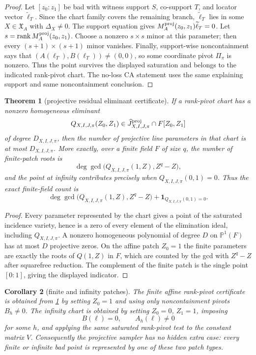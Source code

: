 \documentclass[11pt]{article}
\newtheorem{theorem}{Theorem}[section]
\newtheorem{corollary}[theorem]{Corollary}
\theoremstyle{definition}
\theoremstyle{remark}
\begin{document}
\begin{proof}
Let $[z_0:z_1]$ be bad with witness support $S$, co-support $T$, and locator
vector $\widetilde\ell_T$.  Since the chart family covers the remaining branch,
$\widetilde\ell_T$ lies in some $X\in\mathfrak X_A$ with $\Delta_X\ne0$.  The
support equation gives
$M^{\rm proj}_A(z_0,z_1)\widetilde\ell_T=0$.  Let
$s=\operatorname{rank}M^{\rm proj}_A(z_0,z_1)$.  Choose a nonzero
$s\times s$ minor at this parameter; then every $(s+1)\times(s+1)$ minor
vanishes.  Finally, support-wise noncontainment says that
$(A(\ell_T),B(\ell_T))\ne(0,0)$, so some coordinate pivot $\Pi_\pi$ is nonzero.
Thus the point survives the displayed saturation and belongs to the indicated
rank-pivot chart.  The no-loss CA statement uses the same explaining support and
same noncontainment conclusion.
\end{proof}

\begin{theorem}[projective residual eliminant certificate]
\label{thm:projective-residual-eliminant-certificate}
If a rank-pivot chart has a nonzero homogeneous eliminant
\[
        Q_{X,I,J,\pi}(Z_0,Z_1)
        \in
        \widehat J^{\rm proj}_{X,I,J,\pi}\cap F[Z_0,Z_1]
\]
of degree $D_{X,I,J,\pi}$, then the number of projective line parameters in that
chart is at most $D_{X,I,J,\pi}$.  More exactly, over a finite field $F$ of size
$q$, the number of finite-patch roots is
\[
        \deg\gcd\bigl(Q_{X,I,J,\pi}(1,Z),Z^q-Z\bigr),
\]
and the point at infinity contributes precisely when
$Q_{X,I,J,\pi}(0,1)=0$.  Thus the exact finite-field count is
\[
        \deg\gcd\bigl(Q_{X,I,J,\pi}(1,Z),Z^q-Z\bigr)
        +\mathbf 1_{Q_{X,I,J,\pi}(0,1)=0}.
\]
\end{theorem}

\begin{proof}
Every parameter represented by the chart gives a point of the saturated
incidence variety, hence is a zero of every element of the elimination ideal,
including $Q_{X,I,J,\pi}$.  A nonzero homogeneous polynomial of degree $D$ on
$\mathbb P^1(F)$ has at most $D$ projective zeros.  On the affine patch
$Z_0=1$ the finite parameters are exactly the roots of $Q(1,Z)$ in $F$, which
are counted by the gcd with $Z^q-Z$ after squarefree reduction.  The complement
of the finite patch is the single point $[0:1]$, giving the displayed indicator.
\end{proof}

\begin{corollary}[finite and infinity patches]
\label{cor:finite-infinity-rank-pivot-patches}
The finite affine rank-pivot certificate is obtained from
\cref{thm:projective-residual-eliminant-certificate} by setting $Z_0=1$ and
using only noncontainment pivots $B_h\ne0$.  The infinity chart is obtained by
setting $Z_0=0$, $Z_1=1$, imposing
\[
        B(\ell)=0,
        \qquad
        A_h(\ell)\ne0
\]
for some $h$, and applying the same saturated rank-pivot test to the constant
matrix $V$.  Consequently the projective sampler has no hidden extra case: every
finite or infinite bad point is represented by one of these two patch types.
\end{corollary}
\end{document}
